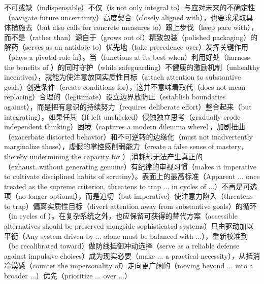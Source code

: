 ﻿\documentclass[lang=cn,11pt]{elegantbook}
\begin{document}
不可或缺（indispensable）不仅（is not only integral to）与应对未来的不确定性（navigate future uncertainty）高度契合（closely aligned with），也要求采取具体措施去（but also calls for concrete measures to）跟上步伐（keep pace with），而不是（rather than）源自于（grows out of）精致包装（polished packaging）的解药（serves as an antidote to）优先地（take precedence over）发挥关键作用（plays a pivotal role in）。当（functions at its best when）利用好处（harness the benefits of ）的同时守护（while safeguarding）不健康的激励机制（unhealthy incentives），就能为使注意放回实质性目标（attach attention to substantive goals）创造条件（create conditions for），这并不意味着取代（does not mean replacing）合理的（legitimate）设立边界放防止（establish boundaries against），而是把有意识的持续努力（requires deliberate effort）整合起来（but integrating）。如果任其（If left unchecked）侵蚀独立思考（gradually erode independent thinking）困境（captures a modern dilemma where），加剧扭曲（exacerbate distorted behavior）和不可逆转的边缘化（must not inadvertently marginalize those），虚假的掌控感削弱能力（create a false sense of mastery，thereby undermining the capacity for ）,消耗却无法产生真正的（exhaust..without generating genuine）有纪律的审视习惯（makes it imperative to cultivate disciplined habits of scrutiny）。表面上的最高标准（Apparent ... once treated as the supreme criterion, threatens to trap ... in cycles of ...）不再是可选项（no longer optional），而是迫切（but imperative）使注意力陷入（threatens to trap）偏离实质性目标（divert attention away from substantive goals）的循环（in cycles of ）。在复杂系统之外，也应保留可获得的替代方案（accessible alternatives should be preserved alongside sophisticated systems）只由驱动加以平衡（Any system driven by ... alone must be balanced with ...），重新校准到（be recalibrated toward）做防线抵御冲动选择（serve as a reliable defense against impulsive choices）成为现实必要（make ... a practical necessity），从抵消冷漠感（counter the impersonality of）走向更广阔的（moving beyond ... into a broader ...）优先（prioritize ... over ...）
\end{document}
